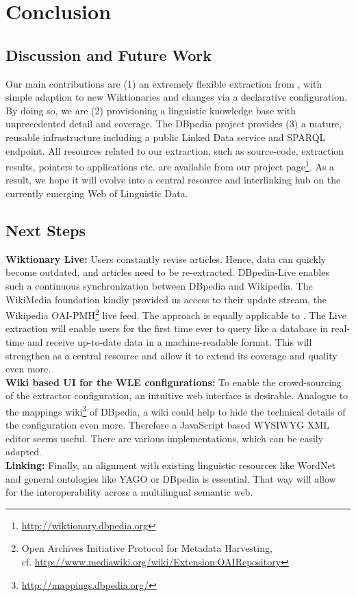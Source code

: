 \section{Conclusion}
\subsection{Discussion and Future Work}
Our main contributions are (1) an extremely flexible extraction from \wik, with simple adaption to new Wiktionaries and changes via a declarative configuration. 
By doing so, we are (2) provisioning a linguistic knowledge base with unprecedented detail and coverage. 
The DBpedia project provides (3) a mature, reusable infrastructure including a public Linked Data service and SPARQL endpoint. All resources related to our \wik extraction, such as source-code, extraction results, pointers to applications etc. are available from our project page\footnote{\url{http://wiktionary.dbpedia.org}}.
As a result, we hope it will evolve into a central resource and interlinking hub on the currently emerging Web of Linguistic Data.

\subsection{Next Steps}
\textbf{Wiktionary Live:}
Users constantly revise articles.
Hence, data can quickly become outdated, and articles need to be re-extracted. DBpedia-Live enables such a continuous synchronization between DBpedia and Wikipedia.
The WikiMedia foundation kindly provided us access to their update stream, the Wikipedia OAI-PMH\footnote{Open Archives Initiative Protocol for Metadata Harvesting,\\
cf. \url{http://www.mediawiki.org/wiki/Extension:OAIRepository}} live feed.
The approach is equally applicable to \wik. 
The \wik Live extraction will enable users for the first time ever to query \wik like a database in real-time and receive up-to-date data in a machine-readable format.
This will strengthen \wik as a central resource and allow it to extend its coverage and quality even more.\\
\textbf{Wiki based UI for the WLE configurations:}
To enable the crowd-sourcing of the extractor configuration, an intuitive web interface is desirable. Analogue to the mappings wiki\footnote{\url{http://mappings.dbpedia.org/}} of DBpedia, a wiki could help to hide the technical details of the configuration even more. 
Therefore a JavaScript based WYSIWYG XML editor seems useful. 
There are various implementations, which can be easily adapted.\\
\textbf{Linking:}
Finally, an alignment with existing linguistic resources like WordNet and general ontologies like YAGO or DBpedia is essential. That way \wik will allow for the interoperability across a multilingual semantic web.

